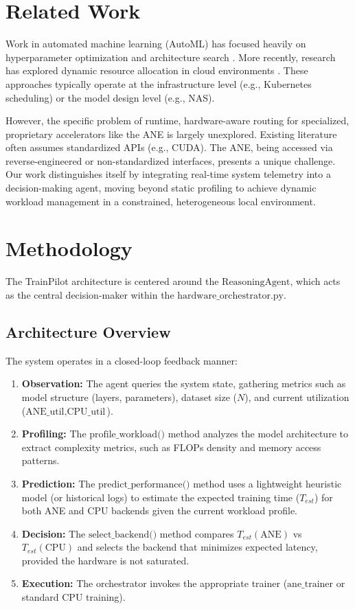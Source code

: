 \documentclass[11pt,a4paper]{article}
\begin{document}
\section{Related Work}
Work in automated machine learning (AutoML) has focused heavily on hyperparameter optimization and architecture search \cite{sklearn}. More recently, research has explored dynamic resource allocation in cloud environments \cite{cloud_sched}. These approaches typically operate at the infrastructure level (e.g., Kubernetes scheduling) or the model design level (e.g., NAS).

However, the specific problem of runtime, hardware-aware routing for specialized, proprietary accelerators like the ANE is largely unexplored. Existing literature often assumes standardized APIs (e.g., CUDA). The ANE, being accessed via reverse-engineered or non-standardized interfaces, presents a unique challenge. Our work distinguishes itself by integrating real-time system telemetry into a decision-making agent, moving beyond static profiling to achieve dynamic workload management in a constrained, heterogeneous local environment.

\section{Methodology}
The TrainPilot architecture is centered around the $\text{ReasoningAgent}$, which acts as the central decision-maker within the $\text{hardware\_orchestrator.py}$.

\subsection{Architecture Overview}
The system operates in a closed-loop feedback manner:
\begin{enumerate}
    \item \textbf{Observation:} The agent queries the system state, gathering metrics such as model structure (layers, parameters), dataset size ($N$), and current utilization ($\text{ANE\_util}, \text{CPU\_util}$).
    \item \textbf{Profiling:} The $\text{profile\_workload()}$ method analyzes the model architecture to extract complexity metrics, such as FLOPs density and memory access patterns.
    \item \textbf{Prediction:} The $\text{predict\_performance()}$ method uses a lightweight heuristic model (or historical logs) to estimate the expected training time ($T_{est}$) for both ANE and CPU backends given the current workload profile.
    \item \textbf{Decision:} The $\text{select\_backend()}$ method compares $T_{est}(\text{ANE})$ vs $T_{est}(\text{CPU})$ and selects the backend that minimizes expected latency, provided the hardware is not saturated.
    \item \textbf{Execution:} The orchestrator invokes the appropriate trainer ($\text{ane\_trainer}$ or standard CPU training).
\end{enumerate}
\end{document}
